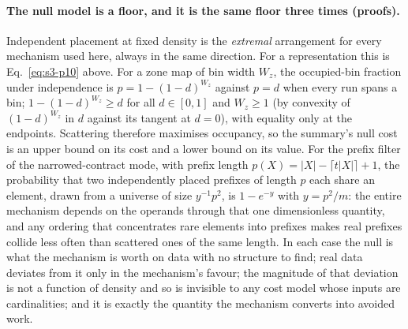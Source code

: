 \paragraph*{The null model is a floor, and it is the same floor three times (proofs).}
Independent placement at fixed density is the \emph{extremal} arrangement for every mechanism used
here, always in the same direction. For a representation this is Eq.~\eqref{eq:s3-p10} above. For a
zone map of bin width $W_z$, the occupied-bin fraction under independence is $p=1-(1-d)^{W_z}$ against
$p=d$ when every run spans a bin; $1-(1-d)^{W_z}\ge d$ for all $d\in[0,1]$ and $W_z\ge1$ (by convexity
of $(1-d)^{W_z}$ in $d$ against its tangent at $d=0$), with equality only at the endpoints. Scattering
therefore maximises occupancy, so the summary's null cost is an upper bound on its cost and a lower
bound on its value. For the prefix filter of the narrowed-contract mode, with prefix length
$p(X)=|X|-\lceil t|X|\rceil+1$, the probability that two independently placed prefixes of length $p$
each share an element, drawn from a universe of size $y^{-1}p^2$, is $1-e^{-y}$ with $y=p^2/m$: the
entire mechanism depends on the operands through that one dimensionless quantity, and any ordering
that concentrates rare elements into prefixes makes real prefixes collide less often than scattered
ones of the same length. In each case the null is what the mechanism is worth on data with no
structure to find; real data deviates from it only in the mechanism's favour; the magnitude of that
deviation is not a function of density and so is invisible to any cost model whose inputs are
cardinalities; and it is exactly the quantity the mechanism converts into avoided work.

